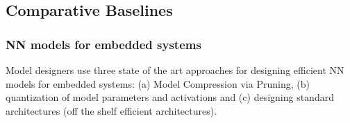 \subsection{Comparative Baselines}
\label{baselines}

\subsubsection{NN models for embedded systems}

Model designers use three state of the art approaches for designing efficient NN models for embedded systems: (a) Model Compression via Pruning, (b) quantization of model parameters and activations and (c) designing standard architectures (off the shelf efficient architectures).

